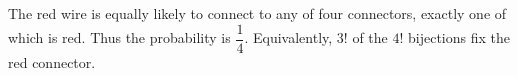The red wire is equally likely to connect to any of four connectors, exactly one of which is red. Thus the probability is $\boxed{\dfrac{1}{4}}$. Equivalently, $3!$ of the $4!$ bijections fix the red connector.
